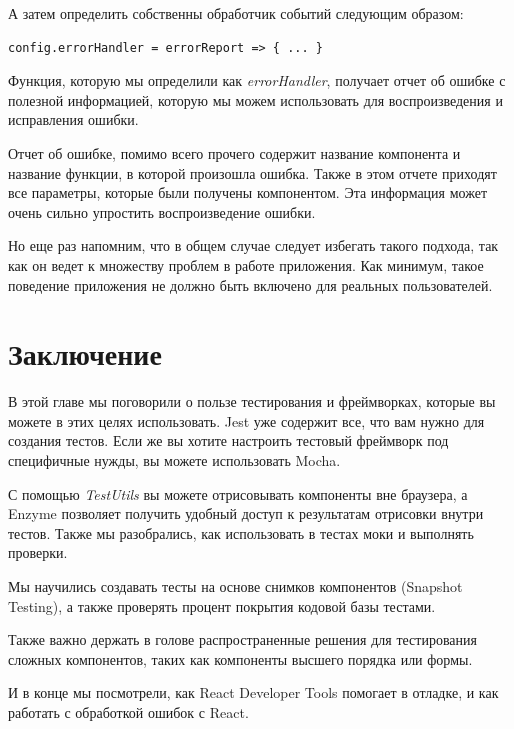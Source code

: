 А затем определить собственны обработчик событий следующим образом:

\begin{lstlisting}
config.errorHandler = errorReport => { ... }
\end{lstlisting}

Функция, которую мы определили как \textit{errorHandler}, получает отчет об ошибке с полезной информацией, которую мы можем использовать для воспроизведения и исправления ошибки.

Отчет об ошибке, помимо всего прочего содержит название компонента и название функции, в которой произошла ошибка. Также в этом отчете приходят все параметры, которые были получены компонентом. Эта информация может очень сильно упростить воспроизведение ошибки.

Но еще раз напомним, что в общем случае следует избегать такого подхода, так как он ведет к множеству проблем в работе приложения. Как минимум, такое поведение приложения не должно быть включено для реальных пользователей.


\section{Заключение}

В этой главе мы поговорили о пользе тестирования и фреймворках, которые вы можете в этих целях использовать. Jest уже содержит все, что вам нужно для создания тестов. Если же вы хотите настроить тестовый фреймворк под специфичные нужды, вы можете использовать Mocha.

С помощью \textit{TestUtils} вы можете отрисовывать компоненты вне браузера, а Enzyme позволяет получить удобный доступ к результатам отрисовки внутри тестов. Также мы разобрались, как использовать в тестах моки и выполнять проверки.

Мы научились создавать тесты на основе снимков компонентов (Snapshot Testing), а также проверять процент покрытия кодовой базы тестами.

Также важно держать в голове распространенные решения для тестирования сложных компонентов, таких как компоненты высшего порядка или формы.

И в конце мы посмотрели, как React Developer Tools помогает в отладке, и как работать с обработкой ошибок с React.













